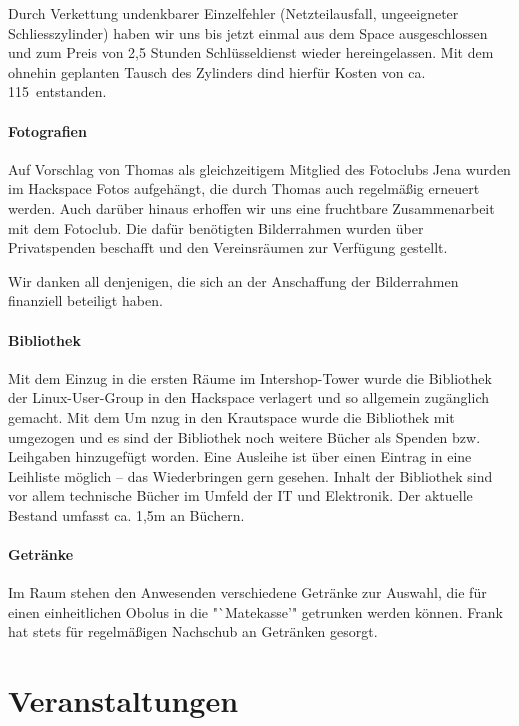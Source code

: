 \documentclass[10pt,DIV16]{scrartcl}
\begin{document}
\label{sec:tueroeffnung}
Durch Verkettung undenkbarer Einzelfehler (Netzteilausfall, 
ungeeigneter Schliesszylinder) haben wir uns bis jetzt einmal aus 
dem Space ausgeschlossen und zum Preis von 2,5 Stunden 
Schlüsseldienst wieder hereingelassen. Mit dem ohnehin geplanten
Tausch des Zylinders dind hierfür Kosten von ca. 115\EUR\ entstanden. 

\paragraph{Fotografien}

Auf Vorschlag von Thomas als gleichzeitigem Mitglied des Fotoclubs 
Jena wurden im Hackspace Fotos aufgehängt, die durch Thomas auch 
regelmäßig erneuert werden.  Auch darüber hinaus erhoffen wir uns 
eine fruchtbare Zusammenarbeit mit dem Fotoclub. Die dafür 
benötigten Bilderrahmen wurden über Privatspenden beschafft und den 
Vereinsräumen zur Verfügung gestellt.

Wir danken all denjenigen, die sich an der Anschaffung der Bilderrahmen
finanziell beteiligt haben.

\paragraph{Bibliothek}

Mit dem Einzug in die ersten Räume im Intershop-Tower wurde die 
Bibliothek der Linux-User-Group in den Hackspace verlagert und so 
allgemein zugänglich gemacht. Mit dem Um nzug in den Krautspace 
wurde die Bibliothek mit umgezogen und es sind der Bibliothek noch 
weitere Bücher als Spenden bzw. Leihgaben hinzugefügt worden. Eine 
Ausleihe ist über einen Eintrag in eine Leihliste möglich -- das 
Wiederbringen gern gesehen. Inhalt der Bibliothek sind vor allem 
technische Bücher im Umfeld der IT und Elektronik. Der aktuelle 
Bestand umfasst ca. 1,5m an Büchern. 

\paragraph{Getränke}
\label{sec:getraenke}

Im Raum stehen den Anwesenden verschiedene Getränke zur Auswahl, die 
für einen einheitlichen Obolus in die "`Matekasse'" getrunken werden 
können. Frank hat stets für regelmäßigen Nachschub an Getränken 
gesorgt.

\section{Veranstaltungen}
\end{document}
